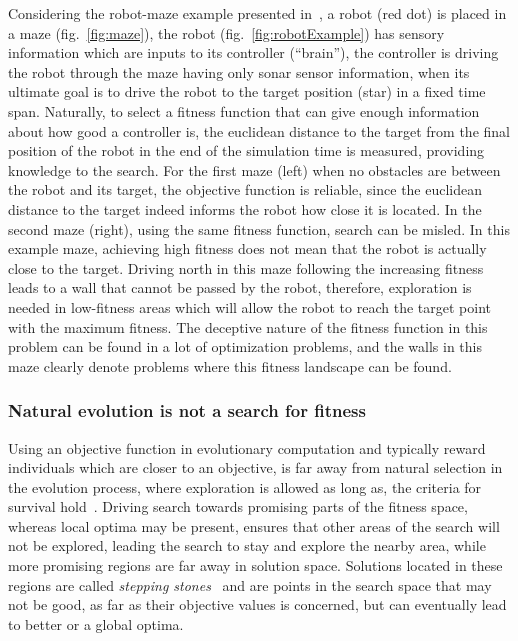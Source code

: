 Considering the robot-maze example presented in~\cite{lehman2011abandoning,lehman2010revising}, a robot (red dot) is placed in a maze (fig.~\ref{fig:maze}), the robot (fig.~\ref{fig:robotExample}) has sensory information which are inputs to its controller (``brain''), the controller is driving the robot through the maze having only sonar sensor information, when its ultimate goal is to drive the robot to the target position (star) in a fixed time span. Naturally, to select a fitness function that can give enough information about how good a controller is, the euclidean distance to the target from the final position of the robot in the end of the simulation time is measured, providing knowledge to the search. For the first maze (left) when no obstacles are between the robot and its target, the objective function is reliable, since the euclidean distance to the target indeed informs the robot how close it is located. In the second maze (right), using the same fitness function, search can be misled. In this example maze, achieving high fitness does not mean that the robot is actually close to the target. Driving north in this maze following the increasing fitness leads to a wall that cannot be passed by the robot, therefore, exploration is needed in low-fitness areas which will allow the robot to reach the target point with the maximum fitness. The deceptive nature of the fitness function in this problem can be found in a lot of optimization problems, and the walls in this maze clearly denote problems where this fitness landscape can be found.

\subsubsection*{Natural evolution is not a search for fitness}

Using an objective function in evolutionary computation and typically reward individuals which are closer to an objective, is far away from natural selection in the evolution process, where exploration is allowed as long as, the criteria for survival hold~\cite{lehman2010revising}. Driving search towards promising parts of the fitness space, whereas local optima may be present, ensures that other areas of the search will not be explored, leading the search to stay and explore the nearby area, while more promising regions are far away in solution space. Solutions located in these regions are called \emph{stepping stones}~\cite{lehman2008exploiting,lehman2011abandoning,lehman2010revising,risi2009novelty} and are points in the search space that may not be good, as far as their objective values is concerned, but can eventually lead to better or a global optima.


